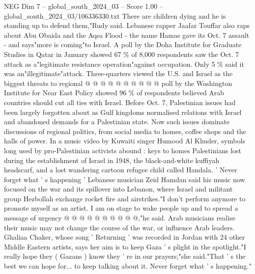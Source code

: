 \begin{textsample}{NEG Dim 7 – global\_south\_2024\_03 – Score 1.00 – global\_south\_2024\_03/106336330.txt}
There are children dying and he is standing up to defend them,"Rudy said.
Lebanese rapper Jaafar Touffar also raps about Abu Obaida and the Aqsa Flood - the name Hamas gave its Oct. 7 assault - and says"more is coming"to Israel.
A poll by the Doha Institute for Graduate Studies in Qatar in January showed 67 \% of 8,000 respondents saw the Oct. 7 attack as a"legitimate resistance operation"against occupation.
Only 5 \% said it was an"illegitimate"attack.
Three-quarters viewed the U.S. and Israel as the biggest threats to regional @ @ @ @ @ @ @ @ @ @ poll by the Washington Institute for Near East Policy showed 96 \% of respondents believed Arab countries should cut all ties with Israel.
Before Oct. 7, Palestinian issues had been largely forgotten about as Gulf kingdoms normalised relations with Israel and abandoned demands for a Palestinian state.
Now such issues dominate discussions of regional politics, from social media to homes, coffee shops and the halls of power.
In a music video by Kuwaiti singer Humood Al Khuder, symbols long used by pro-Palestinian activists abound : keys to homes Palestinians lost during the establishment of Israel in 1948, the black-and-white kuffiyah headscarf, and a lost wandering cartoon refugee child called Handala. ' Never forget what ' s happening ' Lebanese musician Zeid Hamdan said his music now focused on the war and its spillover into Lebanon, where Israel and militant group Hezbollah exchange rocket fire and airstrikes."I don't perform anymore to promote myself as an artist.
I am on stage to wake people up and to spread a message of urgency @ @ @ @ @ @ @ @ @ @,"he said.
Arab musicians realise their music may not change the course of the war, or influence Arab leaders.
Ghaliaa Chaker, whose song ' Returning ' was recorded in Jordan with 24 other Middle Eastern artists, says her aim is to keep Gaza ' s plight in the spotlight."I really hope they ( Gazans ) know they ' re in our prayers,"she said."That ' s the best we can hope for... to keep talking about it.
Never forget what ' s happening."

\end{textsample}
